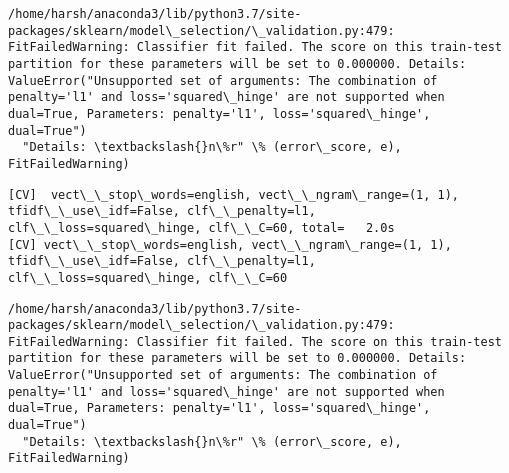 \documentclass[11pt]{article}
\begin{document}
    \begin{Verbatim}[commandchars=\\\{\}]
/home/harsh/anaconda3/lib/python3.7/site-packages/sklearn/model\_selection/\_validation.py:479: FitFailedWarning: Classifier fit failed. The score on this train-test partition for these parameters will be set to 0.000000. Details: 
ValueError("Unsupported set of arguments: The combination of penalty='l1' and loss='squared\_hinge' are not supported when dual=True, Parameters: penalty='l1', loss='squared\_hinge', dual=True")
  "Details: \textbackslash{}n\%r" \% (error\_score, e), FitFailedWarning)

    \end{Verbatim}

    \begin{Verbatim}[commandchars=\\\{\}]
[CV]  vect\_\_stop\_words=english, vect\_\_ngram\_range=(1, 1), tfidf\_\_use\_idf=False, clf\_\_penalty=l1, clf\_\_loss=squared\_hinge, clf\_\_C=60, total=   2.0s
[CV] vect\_\_stop\_words=english, vect\_\_ngram\_range=(1, 1), tfidf\_\_use\_idf=False, clf\_\_penalty=l1, clf\_\_loss=squared\_hinge, clf\_\_C=60 

    \end{Verbatim}

    \begin{Verbatim}[commandchars=\\\{\}]
/home/harsh/anaconda3/lib/python3.7/site-packages/sklearn/model\_selection/\_validation.py:479: FitFailedWarning: Classifier fit failed. The score on this train-test partition for these parameters will be set to 0.000000. Details: 
ValueError("Unsupported set of arguments: The combination of penalty='l1' and loss='squared\_hinge' are not supported when dual=True, Parameters: penalty='l1', loss='squared\_hinge', dual=True")
  "Details: \textbackslash{}n\%r" \% (error\_score, e), FitFailedWarning)

    \end{Verbatim}
\end{document}
